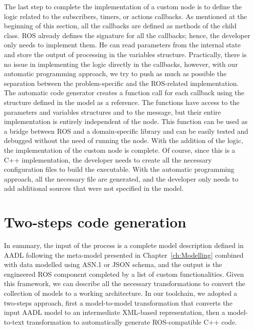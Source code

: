 The last step to complete the implementation of a custom node is to define the logic related to the subscribers, timers, or actions callbacks. As mentioned at the beginning of this section, all the callbacks are defined as methods of the child class. ROS already defines the signature for all the callbacks; hence, the developer only needs to implement them. He can read parameters from the internal state and store the output of processing in the variables structure. Practically, there is no issue in implementing the logic directly in the callbacks, however, with our automatic programming approach, we try to push as much as possible the separation between the problem-specific and the ROS-related implementation. The automatic code generator creates a function call for each callback using the structure defined in the model as a reference. The functions have access to the parameters and variables structures and to the message, but their entire implementation is entirely independent of the node. This function can be used as a bridge between ROS and a domain-specific library and can be easily tested and debugged without the need of running the node. With the addition of the logic, the implementation of the custom node is complete. Of course, since this is a C++ implementation, the developer needs to create all the necessary configuration files to build the executable. With the automatic programming approach, all the necessary file are generated, and the developer only needs to add additional sources that were not specified in the model.

\section{Two-steps code generation}
In summary, the input of the process is a complete model description defined in AADL following the meta-model presented in Chapter~\ref{ch:Modelling} combined with data modelled using ASN.1 or JSON schema, and the output is the engineered ROS component completed by a list of custom functionalities. Given this framework, we can describe all the necessary transformations to convert the collection of models to a working architecture. In our toolchain, we adopted a two-steps approach, first a model-to-model transformation that converts the input AADL model to an intermediate XML-based representation, then a model-to-text transformation to automatically generate ROS-compatible C++ code.

